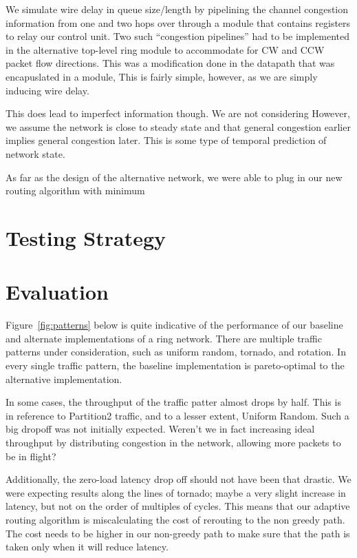 \documentclass[10pt]{article}
\begin{document}
We simulate wire delay in queue size/length by pipelining the channel congestion
information from one and two hops over through a module that contains registers 
to relay our control unit. Two such ``congestion pipelines'' had to be implemented
in the alternative top-level ring module to accommodate for CW and CCW packet flow
directions.
This was a modification done in the datapath that was encapuslated in a 
module, 
This is fairly simple, however, as we are simply inducing wire delay. \par
This does lead to imperfect information though. We are not considering 
However, we assume the network is close to steady state and that general 
congestion earlier implies general congestion later.
This is some type of temporal prediction of network state. \par

As far as the design of the alternative network, we were able to plug in our
new routing algorithm with minimum 

\section{Testing Strategy}

\section{Evaluation}

Figure~\ref{fig:patterns} below is quite indicative of the performance of
our baseline and alternate implementations of a ring network.
There are multiple traffic patterns under consideration, such as uniform 
random, tornado, and rotation. 
In every single traffic pattern, the baseline implementation is pareto-optimal
to the alternative implementation. \par

In some cases, the throughput of the traffic patter almost drops by half.
This is in reference to Partition2 traffic, 
and to a lesser extent, Uniform Random. 
Such a big dropoff was not initially expected. 
Weren't we in fact increasing ideal throughput by distributing congestion in 
the network, allowing more packets to be in flight? 

Additionally, the zero-load latency drop off should not have been that drastic.
We were expecting results along the lines of tornado; maybe a very slight
increase in latency, but not on the order of multiples of cycles. 
This means that our adaptive routing algorithm is miscalculating the cost
of rerouting to the non greedy path. 
The cost needs to be higher in our non-greedy path to make sure that the path 
is taken only when it will reduce latency. \par
\end{document}
